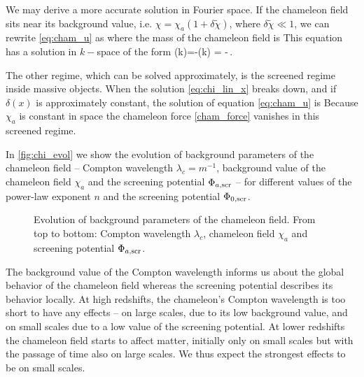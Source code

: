 We may derive a more accurate solution in Fourier space. If the chameleon field sits near its background value, i.e. $\chi=\chi_a\left(1 + \delta\tilde\chi \right)$, where $\delta\tilde\chi \ll 1$, we can rewrite \eqref{eq:cham_u} as
where the mass of the chameleon field is
This equation has a solution in $k-$space of the form
\eq
{
\label{eq:chi_lin_k}
	\hat{\chi}(k)=-\hat{\delta}(k) = -\,.
}

The other regime, which can be solved approximately, is the screened regime inside massive objects. When the solution \eqref{eq:chi_lin_x} breaks down, and if $\delta(x)$ is approximately constant, the solution of equation \eqref{eq:cham_u} is
Because $\chi_a$ is constant in space the chameleon force \eqref{cham_force} vanishes in this screened regime.

In \autoref{fig:chi_evol} we show the evolution of background parameters of the chameleon field -- Compton wavelength $\lambda_c=m^{-1}$, background value of the chameleon field $\chi_a$ and the screening potential $\Phi_{a,\text{\scriptsize scr}}$ -- for different values of the power-law exponent $n$ and the screening potential $\Phi_{0,\text{\scriptsize scr}}$.

\begin{figure}
\centering
	\begin{subfigure}{1.0\textwidth}
	\end{subfigure}
	\begin{subfigure}{1.0\textwidth}
	\end{subfigure}
    \caption{Evolution of background parameters of the chameleon field. From top to bottom: Compton wavelength $\lambda_c$, chameleon field $\chi_a$ and screening potential $\Phi_{a,\text{\scriptsize scr}}$.}
    \label{fig:chi_evol}
\end{figure}

The background value of the Compton wavelength informs us about the global behavior of the chameleon field whereas the screening potential describes its behavior locally. At high redshifts, the chameleon's Compton wavelength is too short to have any effects -- on large scales, due to its low background value, and on small scales due to a low value of the screening potential. At lower redshifts the chameleon field starts to affect matter, initially only on small scales but with the passage of time also on large scales. We thus expect the strongest effects to be on small scales.
